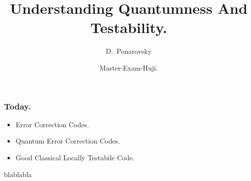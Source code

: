 \documentclass[usenames, aspectratio=169]{beamer}
\title[Understanding Quantumness And Testability.] %
{Understanding Quantumness And Testability.}
\subtitle{  }
\author[D.~Ponarovsky] %
	{D.~Ponarovsky\inst{1}}
\institute[HUJI] %
{  Faculty of Computer Science\newline
  Hebrew University of Jerusalem
}
\date[2023] %
{Master-Exam-Huji.}
\newcommand{\pslsq}[4]{
\begin{frame}
    \frametitle{#1} 
    \texttt{[image: ../source/\#3]}
    #4  
  \end{frame}
}
\newcommand{\psls}[4]{
  \begin{frame}
    \frametitle{#1} 
    \begin{columns}[t]
      \begin{column}{.48\textwidth}
        #4
      \end{column}
      \begin{column}{.52\textwidth}
        \adjincludegraphics[width=.98\linewidth, valign=t]{../source/#3}
      \end{column} 
    \end{columns}
  \end{frame}
}
\begin{document}

\begin{frame}
  \maketitle
\end{frame}

\begin{frame}
  \frametitle{ Today. }
  \begin{itemize}
    \item<1-> Error Correction Codes. 
    \item<2->Quantum Error Correction Codes.
    \item<3->Good Classical Locally Testabile Code.
  \end{itemize} 
\end{frame}

\begin{frame}
blablabla
\end{frame} 


\end{document}
